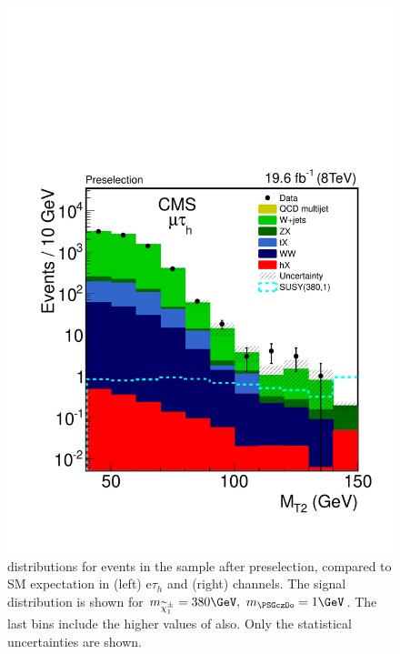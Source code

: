 \begin{figure}[!htb]
\includegraphics[angle=0,scale=0.375]{SelectionMuTau/MT2_mutau.pdf}
\caption{\mttwo  distributions for events in the sample after preselection, compared to SM expectation in (left) e$\tau_{h}$ and (right) \muTau channels. The signal distribution is shown for $m_{\chione}=380\GeV,~m_{\PSGczDo}=1\GeV$. The last bins include the higher values of \mttwo also. Only the statistical uncertainties are shown.}
\label{fig:mt2leptontau}
\end{figure}






